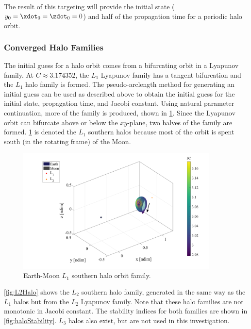 The result of this targeting will provide the initial state ($y_{0}=\xdot_{0}=\zdot_{0}=0$) and
half of the propagation time for a periodic halo orbit.

\subsubsection{Converged Halo Families}
The initial guess for a halo orbit comes from a bifurcating orbit in a Lyapunov family. At
$C\approx3.174352$, the $L_{1}$ Lyapunov family has a tangent bifurcation and the $L_{1}$ halo
family is formed. The pseudo-arclength method for generating an initial guess can be used as
described above to obtain the initial guess for the initial state, propagation time, and Jacobi
constant. Using natural parameter continuation, more of the family is produced, shown in
\cref{fig:L1Halo}. Since the Lyapunov orbit can bifurcate above or below the $xy$-plane, two halves
of the family are formed. \cref{fig:L1Halo} is denoted the $L_{1}$ southern halos because most of
the orbit is spent south (in the rotating frame) of the Moon.

\begin{figure}[ht]
    \centering
    \includegraphics[width=0.9\textwidth]{figures/L1HaloFamily.pdf}
    \caption{Earth-Moon $L_{1}$ southern halo orbit family.}
    \label{fig:L1Halo}
\end{figure}

\cref{fig:L2Halo} shows the $L_{2}$ southern halo family, generated in the same way as the $L_{1}$
halos but from the $L_{2}$ Lyapunov family. Note that these halo families are not monotonic in
Jacobi constant. The stability indices for both families are shown in \cref{fig:haloStability}.
$L_{3}$ halos also exist, but are not used in this investigation.

